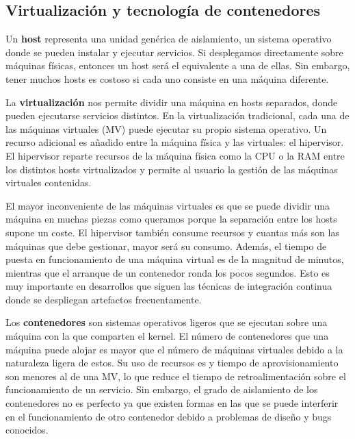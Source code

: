 \documentclass[11pt,spanish,listoffigures,listoftables]{tfgetsinf}
\begin{document}
\subsection{Virtualización y tecnología de contenedores}

Un \textbf{host} representa una unidad genérica de aislamiento, un sistema operativo donde se pueden instalar y ejecutar servicios. Si desplegamos directamente sobre máquinas físicas, entonces un host será el equivalente a una de ellas. Sin embargo, tener muchos hosts es costoso si cada uno consiste en una máquina diferente. \cite{Newman2015a}

La \textbf{virtualización} nos permite dividir una máquina en hosts separados, donde pueden ejecutarse servicios distintos. En la virtualización tradicional, cada una de las máquinas virtuales (MV) puede ejecutar su propio sistema operativo. Un recurso adicional es añadido entre la máquina física y las virtuales: el hipervisor. El hipervisor reparte recursos de la máquina física como la CPU o la RAM entre los distintos hosts virtualizados y permite al usuario la gestión de las máquinas virtuales contenidas.

El mayor inconveniente de las máquinas virtuales es que se puede dividir una máquina en muchas piezas como queramos porque la separación entre los hosts supone un coste. El hipervisor también consume recursos y cuantas más son las máquinas que debe gestionar, mayor será su consumo. Además, el tiempo de puesta en funcionamiento de una máquina virtual es de la magnitud de minutos, mientras que el arranque de un contenedor ronda los pocos segundos. \cite{Dua2014} Esto es muy importante en desarrollos que siguen las técnicas de integración continua donde se despliegan artefactos frecuentamente. 

Los \textbf{contenedores} son sistemas operativos ligeros que se ejecutan sobre una máquina con la que comparten el kernel. El número de contenedores que una máquina puede alojar es mayor que el número de máquinas virtuales debido a la naturaleza ligera de estos. \cite{Dua2014} Su uso de recursos es y tiempo de aprovisionamiento son menores al de una MV, lo que reduce el tiempo de retroalimentación sobre el funcionamiento de un servicio. Sin embargo, el grado de aislamiento de los contenedores no es perfecto ya que existen formas en las que se puede interferir en el funcionamiento de otro contenedor debido a problemas de diseño y bugs conocidos. \cite{Newman2015a}
\end{document}
